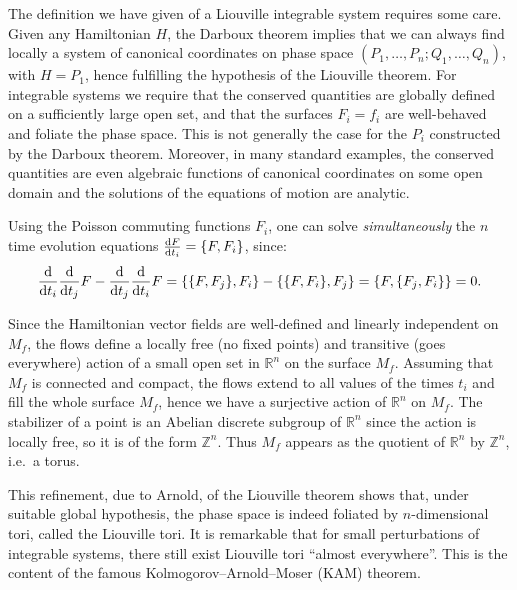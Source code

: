 \begin{remark}
    The definition we have given of a Liouville integrable system requires some care.
    Given any Hamiltonian $H$, the Darboux theorem implies that we
    can always find locally a system of canonical coordinates on phase space $(P_1, \dots, P_n; Q_1, \dots, Q_n)$, with $H = P_1$, hence fulfilling the hypothesis of the Liouville theorem. For integrable systems we require that the conserved quantities are globally defined on a sufficiently large open set, and that the surfaces $F_i = f_i$ are well-behaved and foliate the phase space.
    This is not generally the case for the $P_i$ constructed by the Darboux theorem. Moreover, in many standard examples, the conserved quantities are even algebraic functions of canonical coordinates on some open domain and the solutions of the equations of motion are analytic.
\end{remark}
\begin{remark}
    Using the Poisson commuting functions $ F_i $, one can solve \emph{simultaneously} the $ n $ time evolution equations $ \dv{F}{t_i} = \{F, F_i\} $, since:
    \begin{equation}
        \dv{}{t_i} \dv{}{t_j} F - \dv{}{t_j} \dv{}{t_i} F
        = \{\{F, F_j\}, F_i\} - \{\{F, F_i\}, F_j\}
        = \{F, \{F_j, F_i\}\} = 0.
    \end{equation}
    
    Since the Hamiltonian vector fields are well-defined and linearly independent on $M_f$, the flows define a locally free (no fixed points) and transitive (goes everywhere) action of a small open set in $ \mathbb{R}^n $ on the surface $ M_f $. Assuming that $ M_f $ is connected and compact, the flows extend to all values of the times $ t_i $ and fill the whole surface $ M_f $, hence we have a surjective action of $ \mathbb{R}^n $ on $ M_f $. The stabilizer of a point is an Abelian discrete subgroup of $ \mathbb{R}^n $ since the action is locally free, so it is of the form $ \mathbb{Z}^n $. Thus $ M_f $ appears as the quotient of $ \mathbb{R}^n $ by $ \mathbb{Z}^n $, i.e.\ a torus.
    
    This refinement, due to Arnold, of the Liouville theorem shows that, under suitable global hypothesis, the phase space is indeed foliated by $ n $-dimensional tori, called the Liouville tori. It is remarkable that for small perturbations of integrable systems, there still exist Liouville tori “almost everywhere”. This is the content of the famous Kolmogorov–Arnold–Moser (KAM) theorem.
\end{remark}
